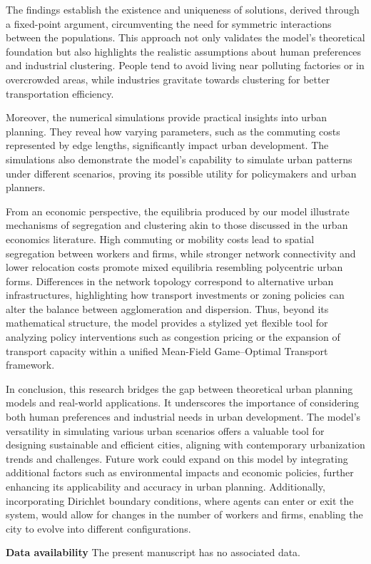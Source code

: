 \documentclass[smallextended,referee,envcountsect,]{svjour3}
\begin{document}
The findings establish the existence and uniqueness of solutions, derived through a fixed-point argument, circumventing the need for symmetric interactions between the populations. This approach not only validates the model's theoretical foundation but also highlights the realistic assumptions about human preferences and industrial clustering. People tend to avoid living near polluting factories or in overcrowded areas, while industries gravitate towards clustering for better transportation efficiency.

Moreover, the numerical simulations provide practical insights into urban planning. They reveal how varying parameters, such as the commuting costs represented by edge lengths, significantly impact urban development. The simulations also demonstrate the model's capability to simulate urban patterns under different scenarios, proving its possible utility for policymakers and urban planners.

{From an economic perspective, the equilibria produced by our model illustrate mechanisms of segregation and clustering akin to those discussed in the urban economics literature. High commuting or mobility costs lead to spatial segregation between workers and firms, while stronger network connectivity and lower relocation costs promote mixed equilibria resembling polycentric urban forms. Differences in the network topology correspond to alternative urban infrastructures, highlighting how transport investments or zoning policies can alter the balance between agglomeration and dispersion. Thus, beyond its mathematical structure, the model provides a stylized yet flexible tool for analyzing policy interventions such as congestion pricing or the expansion of transport capacity within a unified Mean-Field Game--Optimal Transport framework.}

In conclusion, this research bridges the gap between theoretical urban planning models and real-world applications. It underscores the importance of considering both human preferences and industrial needs in urban development. The model's versatility in simulating various urban scenarios offers a valuable tool for designing sustainable and efficient cities, aligning with contemporary urbanization trends and challenges. Future work could expand on this model by integrating additional factors such as environmental impacts and economic policies, further enhancing its applicability and accuracy in urban planning. Additionally, incorporating Dirichlet boundary conditions, where agents can enter or exit the system, would allow for changes in the number of workers and firms, enabling the city to evolve into different configurations.
\par\medskip\noindent
{\bf Data availability} The present manuscript has no associated data.
\end{document}
